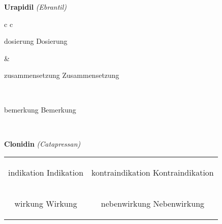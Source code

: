\documentclass[12pt]{beamer}
\begin{document}
\begin{frame}{
    \textbf{Urapidil}
    \textit{(Ebrantil)}
}
    \begin{tabular}{c c}
        \begin{beamercolorbox}[wd=\boxwidth\textwidth,ht=\boxheight\textheight,sep=1em]{dosierung}
        Dosierung
        \end{beamercolorbox} & 
        \begin{beamercolorbox}[wd=\boxwidth\textwidth,ht=\boxheight\textheight,sep=1em]{zusammensetzung}
        Zusammensetzung
        \end{beamercolorbox} \\
        \begin{beamercolorbox}[wd=\textwidth,ht=\boxheight\textheight,sep=1em]{bemerkung}
        Bemerkung
        \end{beamercolorbox} \\
    \end{tabular}
\end{frame}

\begin{frame}{
    \textbf{Clonidin}
    \textit{(Catapressan)}
}
    \begin{tabular}{c c}
        \begin{beamercolorbox}[wd=\boxwidth\textwidth,ht=\boxheight\textheight,sep=1em]{indikation}
        Indikation
        \end{beamercolorbox} & 
        \begin{beamercolorbox}[wd=\boxwidth\textwidth,ht=\boxheight\textheight,sep=1em]{kontraindikation}
        Kontraindikation 
        \end{beamercolorbox} \\
        \begin{beamercolorbox}[wd=\boxwidth\textwidth,ht=\boxheight\textheight,sep=1em]{wirkung}
        Wirkung
        \end{beamercolorbox} & 
        \begin{beamercolorbox}[wd=\boxwidth\textwidth,ht=\boxheight\textheight,sep=1em]{nebenwirkung}
        Nebenwirkung
        \end{beamercolorbox} \\
    \end{tabular}
\end{frame}
\end{document}
